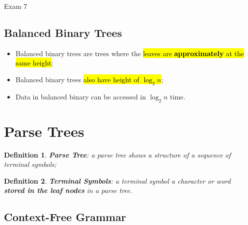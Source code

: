 \documentclass{note}
\newtheorem{definition}{Definition}
\begin{document}
\begin{note}{Exam 7}
    \subsection{Balanced Binary Trees}
    \begin{itemize}
        \item Balanced binary trees are trees where the \hl{leaves are \textbf{approximately} at the same height};
        \item Balanced binary trees \hl{also have height of $ \log_{2}n $};
        \item Data in balanced binary can be accessed in $ \log_{2}n $ time.
    \end{itemize}

\section{Parse Trees}

\begin{definition}
    \textbf{Parse Tree}: a parse tree shows a structure of a sequence of terminal symbols;
\end{definition}

\begin{definition}
    \textbf{Terminal Symbols}: a terminal symbol a character or word \textbf{stored in the leaf nodes} in a parse tree.
\end{definition}

    \subsection{Context-Free Grammar}


\end{note}
\end{document}
